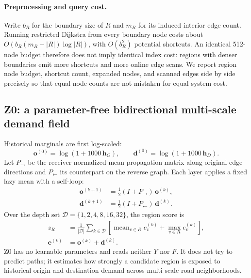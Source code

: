 \documentclass[5p,twocolumn,authoryear]{elsarticle}
\newcommand{\zmethod}{Z0}
\begin{document}
\paragraph{Preprocessing and query cost.}
Write $b_R$ for the boundary size of $R$ and $m_R$ for its induced interior edge count.
Running restricted Dijkstra from every boundary node costs about
$O\!\left(b_R(m_R+|R|)\log |R|\right)$, with $O(b_R^2)$ potential shortcuts. An identical
512-node budget therefore does not imply identical index cost: regions with denser
boundaries emit more shortcuts and more online edge scans. We report region node budget,
shortcut count, expanded nodes, and scanned edges side by side precisely so that equal node
counts are not mistaken for equal system cost.

\subsection{\zmethod: a parameter-free bidirectional multi-scale demand field}

Historical marginals are first log-scaled:
\begin{equation}
  \bm{o}^{(0)}=\log(1+1000\,\bm{h}_O),\qquad
  \bm{d}^{(0)}=\log(1+1000\,\bm{h}_D).
\end{equation}
Let $P_{\rightarrow}$ be the receiver-normalized mean-propagation matrix along original edge
directions and $P_{\leftarrow}$ its counterpart on the reverse graph. Each layer applies a
fixed lazy mean with a self-loop:
\begin{equation}
  \begin{aligned}
  \bm{o}^{(k+1)}&=\tfrac{1}{2}(I+P_{\rightarrow})\,\bm{o}^{(k)},\\
  \bm{d}^{(k+1)}&=\tfrac{1}{2}(I+P_{\leftarrow})\,\bm{d}^{(k)}.
  \end{aligned}
  \label{eq:z0diffusion}
\end{equation}
Over the depth set $\mathcal{D}=\{1,2,4,8,16,32\}$, the region score is
\begin{equation}
  \begin{aligned}
  z_R&=\frac{1}{|\mathcal{D}|}\sum_{k\in\mathcal{D}}
  \left[\operatorname{mean}_{v\in R} e_v^{(k)}
  +\operatorname{max}_{v\in R} e_v^{(k)}\right],\\
  \bm{e}^{(k)}&=\bm{o}^{(k)}+\bm{d}^{(k)}.
  \end{aligned}
  \label{eq:z0score}
\end{equation}
\zmethod{} has no learnable parameters and reads neither $Y$ nor $F$. It does not try to
predict paths; it estimates how strongly a candidate region is exposed to historical
origin and destination demand across multi-scale road neighborhoods.
\end{document}
